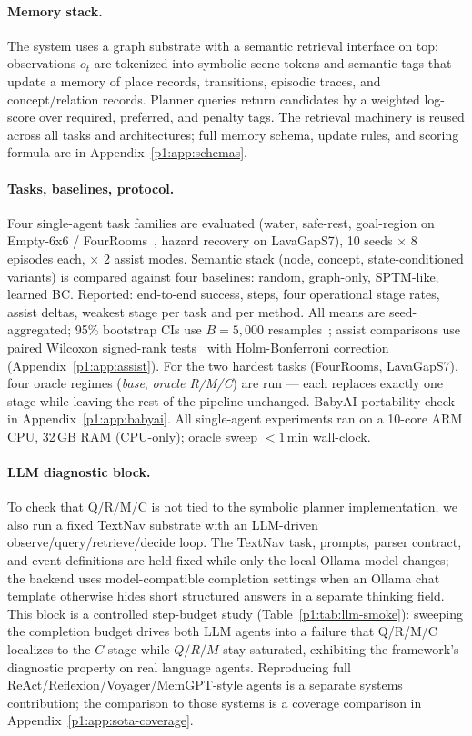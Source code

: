 \documentclass{article}
\begin{document}
\paragraph{Memory stack.}
The system uses a graph substrate with a semantic retrieval interface on top: observations $o_t$ are tokenized into symbolic scene tokens and semantic tags that update a memory of place records, transitions, episodic traces, and concept/relation records. Planner queries return candidates by a weighted log-score over required, preferred, and penalty tags. The retrieval machinery is reused across all tasks and architectures; full memory schema, update rules, and scoring formula are in Appendix~\ref{p1:app:schemas}.

\paragraph{Tasks, baselines, protocol.}
Four single-agent task families are evaluated (water, safe-rest, goal-region on Empty-6x6 / FourRooms~\citep{sutton1999between}, hazard recovery on LavaGapS7), 10 seeds $\times$ 8 episodes each, $\times$ 2 assist modes. Semantic stack (node, concept, state-conditioned variants) is compared against four baselines: random, graph-only, SPTM-like, learned BC. Reported: end-to-end success, steps, four operational stage rates, assist deltas, weakest stage per task and per method. All means are seed-aggregated; 95\% bootstrap CIs use $B{=}5{,}000$ resamples~\citep{efron1979bootstrap}; assist comparisons use paired Wilcoxon signed-rank tests~\citep{wilcoxon1945individual} with Holm-Bonferroni correction~\citep{holm1979simple} (Appendix~\ref{p1:app:assist}). For the two hardest tasks (FourRooms, LavaGapS7), four oracle regimes (\emph{base}, \emph{oracle R/M/C}) are run — each replaces exactly one stage while leaving the rest of the pipeline unchanged. BabyAI portability check in Appendix~\ref{p1:app:babyai}. All single-agent experiments ran on a 10-core ARM CPU, 32\,GB RAM (CPU-only); oracle sweep $<1$\,min wall-clock.

\paragraph{LLM diagnostic block.}
To check that Q/R/M/C is not tied to the symbolic planner implementation, we also run a fixed TextNav substrate with an LLM-driven observe/query/retrieve/decide loop. The TextNav task, prompts, parser contract, and event definitions are held fixed while only the local Ollama model changes; the backend uses model-compatible completion settings when an Ollama chat template otherwise hides short structured answers in a separate thinking field. This block is a controlled step-budget study (Table~\ref{p1:tab:llm-smoke}): sweeping the completion budget drives both LLM agents into a failure that Q/R/M/C localizes to the $C$ stage while $Q/R/M$ stay saturated, exhibiting the framework's diagnostic property on real language agents. Reproducing full ReAct/Reflexion/Voyager/MemGPT-style agents is a separate systems contribution; the comparison to those systems is a coverage comparison in Appendix~\ref{p1:app:sota-coverage}.
\end{document}
